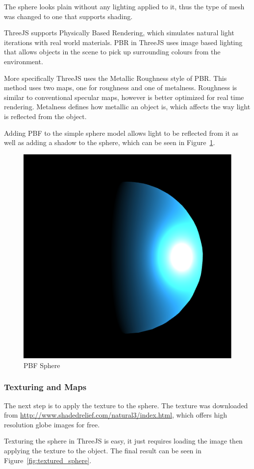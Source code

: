 \documentclass[]{article}
\begin{document}
The sphere looks plain without any lighting applied to it,
thus the type of mesh was changed to one that supports shading.

ThreeJS supports Physically Based Rendering, which simulates natural light iterations with real world materials\cite{}.
PBR in ThreeJS uses image based lighting that allows objects in the scene to pick up surrounding colours from the environment.

More specifically ThreeJS uses the Metallic Roughness style of PBR.
This method uses two maps, one for roughness and one of metalness.
Roughness is similar to conventional specular maps,
however is better optimized for real time rendering\cite{}.
Metalness defines how metallic an object is,
which affects the way light is reflected from the object.

Adding PBF to the simple sphere model allows light to be reflected from it as well as adding a shadow to the sphere,
which can be seen in Figure~\ref{fig:pbf_sphere}.

\begin{figure}[H]
   \centering
   \includegraphics[width=0.5\linewidth]{images/pbf_sphere}
   \caption{PBF Sphere}
   \label{fig:pbf_sphere}
\end{figure}

\subsubsection{Texturing and Maps}

The next step is to apply the texture to the sphere.
The texture was downloaded from \url{http://www.shadedrelief.com/natural3/index.html},
which offers high resolution globe images for free.

Texturing the sphere in ThreeJS is easy, it just requires loading the image then applying the texture to the object.
The final result can be seen in Figure~\ref{fig:textured_sphere}.
\end{document}

